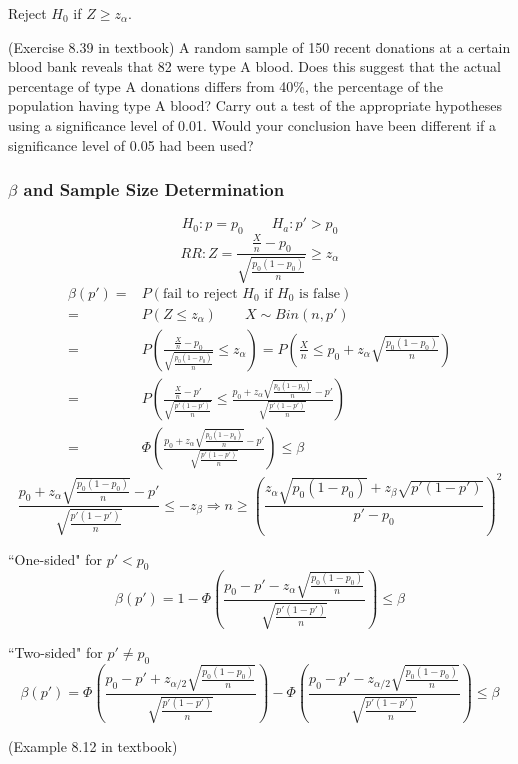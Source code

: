 Reject $H_0$ if $Z\geq z_{\alpha}$.

\begin{exmp}
(Exercise 8.39 in textbook)
A random sample of 150 recent donations at a certain blood bank reveals that 82 were type A blood. Does this suggest that the actual percentage of type A donations differs from 40\%, the percentage of the population having type A blood? Carry out a test of the appropriate hypotheses using a significance level of 0.01. Would your conclusion have been different if a significance level of 0.05 had been used?
\end{exmp}

\subsubsection{$\beta$ and Sample Size Determination}
\[H_0:p=p_0 \qquad H_a:p'>p_0\]
\[RR:Z=\frac{\frac{X}{n}-p_0}{\sqrt{\frac{p_0(1-p_0)}{n}}}\geq z_{\alpha}\]
\begin{align*}
\beta(p') =& P(\text{fail to reject }H_0 \text{ if }H_0 \text{ is false}) \\
= & P(Z\leq z_{\alpha}) \qquad X \sim Bin(n,p') \\
= & P\left(\frac{\frac{X}{n}-p_0}{\sqrt{\frac{p_0(1-p_0)}{n}}} \leq z_{\alpha}\right) = P\left(\frac{X}{n}\leq p_0+z_{\alpha}\sqrt{\frac{p_0(1-p_0)}{n}} \right) \\
= & P\left( \frac{\frac{X}{n}-p'}{\sqrt{\frac{p'(1-p')}{n}}}  \leq \frac{p_0+z_{\alpha}\sqrt{\frac{p_0(1-p_0)}{n}}-p'}{\sqrt{\frac{p'(1-p')}{n}}} \right) \\
= & \Phi\left(\frac{p_0+z_{\alpha}\sqrt{\frac{p_0(1-p_0)}{n}}-p'}{\sqrt{\frac{p'(1-p')}{n}}}\right) \leq \beta
\end{align*}
\[\frac{p_0+z_{\alpha}\sqrt{\frac{p_0(1-p_0)}{n}}-p'}{\sqrt{\frac{p'(1-p')}{n}}} \leq -z_{\beta} \Rightarrow n \geq \left( \frac{z_{\alpha}\sqrt{p_0(1-p_0)}+z_{\beta}\sqrt{p'(1-p')}}{p'-p_0}\right)^2\]

``One-sided" for $p'<p_0$
\[\beta(p')= 1- \Phi\left(\frac{p_0-p'-z_{\alpha}\sqrt{\frac{p_0(1-p_0)}{n}}}{\sqrt{\frac{p'(1-p')}{n}}}\right) \leq \beta \]

``Two-sided" for $p'\neq p_0$
\[\beta(p')= \Phi\left(\frac{p_0-p'+z_{\alpha/2}\sqrt{\frac{p_0(1-p_0)}{n}}}{\sqrt{\frac{p'(1-p')}{n}}}\right)- \Phi\left(\frac{p_0-p'-z_{\alpha/2}\sqrt{\frac{p_0(1-p_0)}{n}}}{\sqrt{\frac{p'(1-p')}{n}}}\right) \leq \beta \]

\begin{exmp}
(Example 8.12 in textbook)
\end{exmp}

